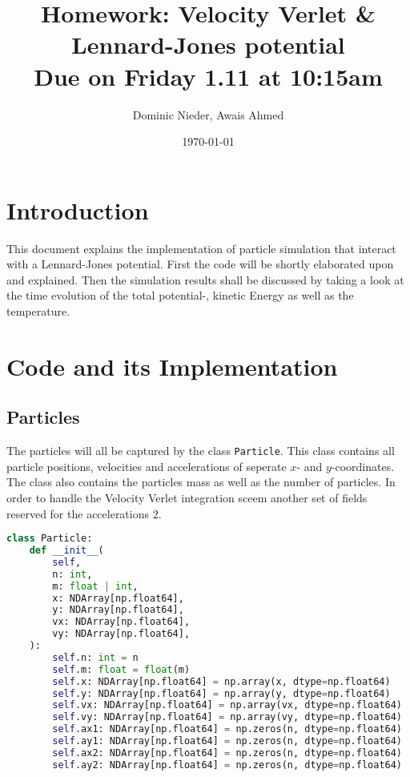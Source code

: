 \documentclass{article}
\title{
    \vspace{2in}
    \textmd{\textbf{Homework: Velocity Verlet \& Lennard-Jones potential}}\\
    \normalsize\vspace{0.1in}\small{Due on Friday 1.11 at 10:15am}\\
    \vspace{0.1in}
    \vspace{3in}
}
\author{Dominic Nieder, Awais Ahmed}
\date{\today}
\begin{document}
\maketitle

\section{Introduction}

This document explains the implementation of particle simulation that interact with a Lennard-Jones potential. First the code will be shortly elaborated upon and explained. Then the simulation results shall be discussed by taking a look at the time evolution of the total potential-, kinetic Energy as well as the temperature.



\section{Code and its Implementation}

\subsection{Particles}

The particles will all be captured by the class \texttt{Particle}. This class contains all particle positions, velocities and accelerations of seperate $x$- and $y$-coordinates. The class also contains the particles mass as well as the number of particles. In order to handle the Velocity Verlet integration sceem  another set of fields reserved for the accelerations \flqq$2$\frqq.

\begin{lstlisting}[language=python, caption={Particle class}]
class Particle:
    def __init__(
        self,
        n: int,
        m: float | int,
        x: NDArray[np.float64],
        y: NDArray[np.float64],
        vx: NDArray[np.float64],
        vy: NDArray[np.float64],
    ):
        self.n: int = n
        self.m: float = float(m)
        self.x: NDArray[np.float64] = np.array(x, dtype=np.float64)
        self.y: NDArray[np.float64] = np.array(y, dtype=np.float64)
        self.vx: NDArray[np.float64] = np.array(vx, dtype=np.float64)
        self.vy: NDArray[np.float64] = np.array(vy, dtype=np.float64)
        self.ax1: NDArray[np.float64] = np.zeros(n, dtype=np.float64)
        self.ay1: NDArray[np.float64] = np.zeros(n, dtype=np.float64)
        self.ax2: NDArray[np.float64] = np.zeros(n, dtype=np.float64)
        self.ay2: NDArray[np.float64] = np.zeros(n, dtype=np.float64)
\end{lstlisting}
\end{document}
